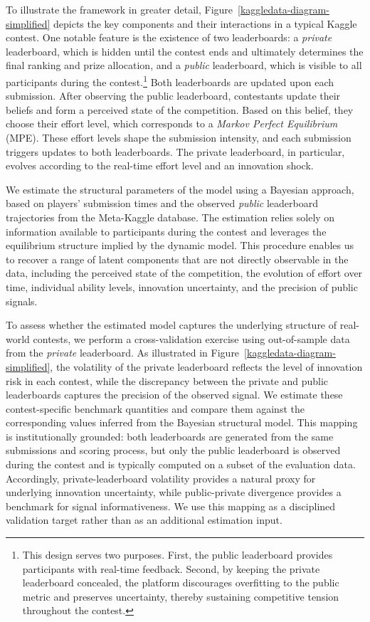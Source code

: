 \documentclass[mnsc]{informs3}
\begin{document}
To illustrate the framework in greater detail, Figure~\ref{kaggledata-diagram-simplified} depicts the key components and their interactions in a typical Kaggle contest.
One notable feature is the existence of two leaderboards: a \textit{private} leaderboard, which is hidden until the contest ends and ultimately determines the final ranking and prize allocation, and a \textit{public} leaderboard, which is visible to all participants during the contest.\footnote{
This design serves two purposes.
First, the public leaderboard provides participants with real-time feedback.
Second, by keeping the private leaderboard concealed, the platform discourages overfitting to the public metric and preserves uncertainty, thereby sustaining competitive tension throughout the contest.
}
Both leaderboards are updated upon each submission.
After observing the public leaderboard, contestants update their beliefs and form a perceived state of the competition.
Based on this belief, they choose their effort level, which corresponds to a \textit{Markov Perfect Equilibrium} (MPE).
These effort levels shape the submission intensity, and each submission triggers updates to both leaderboards.
The private leaderboard, in particular, evolves according to the real-time effort level and an innovation shock.


We estimate the structural parameters of the model using a Bayesian approach, based on players’ submission times and the observed \textit{public} leaderboard trajectories from the Meta-Kaggle database.
The estimation relies solely on information available to participants during the contest and leverages the equilibrium structure implied by the dynamic model.
This procedure enables us to recover a range of latent components that are not directly observable in the data, including the perceived state of the competition, the evolution of effort over time, individual ability levels, innovation uncertainty, and the precision of public signals.


To assess whether the estimated model captures the underlying structure of real-world contests, we perform a cross-validation exercise using out-of-sample data from the \textit{private} leaderboard.
As illustrated in Figure~\ref{kaggledata-diagram-simplified}, the volatility of the private leaderboard reflects the level of innovation risk in each contest, while the discrepancy between the private and public leaderboards captures the precision of the observed signal.
We estimate these contest-specific benchmark quantities and compare them against the corresponding values inferred from the Bayesian structural model.
This mapping is institutionally grounded: both leaderboards are generated from the same submissions and scoring process, but only the public leaderboard is observed during the contest and is typically computed on a subset of the evaluation data.
Accordingly, private-leaderboard volatility provides a natural proxy for underlying innovation uncertainty, while public-private divergence provides a benchmark for signal informativeness.
We use this mapping as a disciplined validation target rather than as an additional estimation input.
\end{document}
